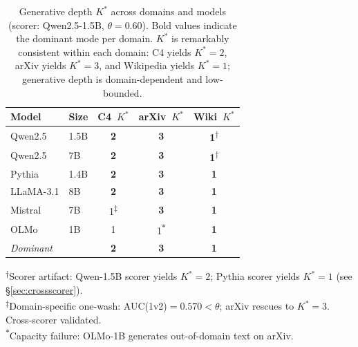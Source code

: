 \begin{table}[t]
\centering
\caption{Generative depth $K^*$ across domains and models (scorer: Qwen2.5-1.5B, $\theta{=}0.60$). Bold values indicate the dominant mode per domain. $K^*$ is remarkably consistent within each domain: C4 yields $K^*{=}2$, arXiv yields $K^*{=}3$, and Wikipedia yields $K^*{=}1$; generative depth is domain-dependent and low-bounded.}
\label{tab:domain_model_kstar}
{\small
\begin{tabular}{llccc}
\toprule
\textbf{Model} & \textbf{Size} & \textbf{C4}~$K^*$ & \textbf{arXiv}~$K^*$ & \textbf{Wiki}~$K^*$ \\
\midrule
Qwen2.5       & 1.5B & \textbf{2} & \textbf{3} & \textbf{1}\textsuperscript{$\dagger$} \\
Qwen2.5       & 7B   & \textbf{2} & \textbf{3} & \textbf{1}\textsuperscript{$\dagger$} \\
Pythia        & 1.4B & \textbf{2} & \textbf{3} & \textbf{1} \\
LLaMA-3.1    & 8B   & \textbf{2} & \textbf{3} & \textbf{1} \\
Mistral       & 7B   & 1\textsuperscript{$\ddagger$} & \textbf{3} & \textbf{1} \\
OLMo          & 1B   & 1 & 1\textsuperscript{$*$} & \textbf{1} \\
\midrule
\textit{Dominant} & & \textbf{2} & \textbf{3} & \textbf{1} \\
\bottomrule
\end{tabular}
}
\vspace{2pt}

{\footnotesize
\textsuperscript{$\dagger$}Scorer artifact: Qwen-1.5B scorer yields $K^*{=}2$; Pythia scorer yields $K^*{=}1$ (see \S\ref{sec:crossscorer}).\\
\textsuperscript{$\ddagger$}Domain-specific one-wash: AUC(1v2)${=}0.570{<}\theta$; arXiv rescues to $K^*{=}3$. Cross-scorer validated.\\
\textsuperscript{$*$}Capacity failure: OLMo-1B generates out-of-domain text on arXiv.
}
\end{table}
